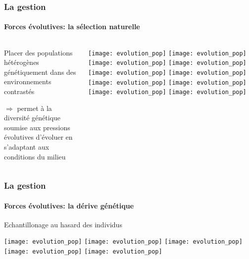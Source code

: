 \begin{frame}
\frametitle{La gestion \insitu}
\framesubtitle{Forces évolutives: la sélection naturelle}

\begin{columns}

\begin{column}{.4\textwidth}
Placer des populations hétérogènes génétiquement dans des environnements contrastés 

$\Rightarrow$ permet à la diversité génétique soumise aux pressions évolutives d'évoluer en s’adaptant aux conditions du milieu
\end{column}

\begin{column}{.6\textwidth}
\begin{overprint}
\centering\texttt{[image: evolution\_pop]}
\centering\texttt{[image: evolution\_pop]}
\centering\texttt{[image: evolution\_pop]}
\centering\texttt{[image: evolution\_pop]}
\centering\texttt{[image: evolution\_pop]}
\centering\texttt{[image: evolution\_pop]}
\centering\texttt{[image: evolution\_pop]}
\centering\texttt{[image: evolution\_pop]}
\centering\texttt{[image: evolution\_pop]}
\centering\texttt{[image: evolution\_pop]}
\end{overprint}
\end{column}

\end{columns}


\end{frame}


\begin{frame}
\frametitle{La gestion \insitu}
\framesubtitle{Forces évolutives: la dérive génétique}

Echantillonage au hasard des individus

\begin{overprint}
\centering\texttt{[image: evolution\_pop]}
\centering\texttt{[image: evolution\_pop]}
\centering\texttt{[image: evolution\_pop]}
\centering\texttt{[image: evolution\_pop]}
\centering\texttt{[image: evolution\_pop]}
\end{overprint}

\end{frame}


